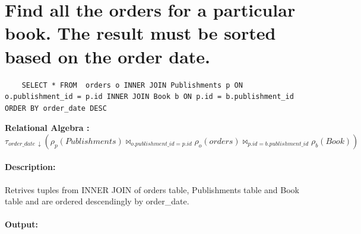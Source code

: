 \documentclass{report}
\begin{document}
\section{Find all the orders for a particular book. The result must be sorted based on the order date. }

\begin{lstlisting}
    SELECT * FROM  orders o INNER JOIN Publishments p ON o.publishment_id = p.id INNER JOIN Book b ON p.id = b.publishment_id ORDER BY order_date DESC
\end{lstlisting}
\vspace{0.5cm}
\textbf{Relational Algebra :} \[ \tau_{order\_date\ \downarrow} ( \rho_p(Publishments) \bowtie_{o.publishment\_id = p.id} \rho_o(orders) \bowtie_{p.id = b.publishment\_id} \rho_b(Book) )  \]
\paragraph{Description: }
Retrives tuples from INNER JOIN of orders table, Publishments table and Book table and are ordered descendingly by order\_date.

\paragraph{Output: }


\end{document}
